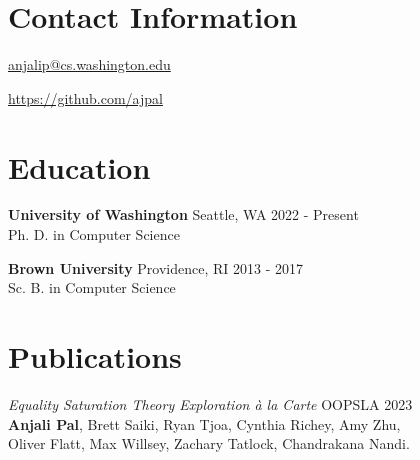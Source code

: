 \documentclass[margin, 10pt]{res} %
\begin{document}
\begin{resume}

 

\section{Contact Information}
\href{mailto:anjalip@cs.washington.edu}{anjalip@cs.washington.edu}

\href{https://github.com/ajpal}{https://github.com/ajpal}



\section{Education} 

{\textbf{University of Washington}} Seattle, WA \hfill 2022 - Present \\
Ph. D. in Computer Science

{\textbf{Brown University}} Providence, RI \hfill 2013 - 2017  \\
Sc. B. in Computer Science

\section{Publications}
{\textit{Equality Saturation Theory Exploration à la Carte}} \hfill OOPSLA 2023 \\
 \textbf{Anjali Pal}, Brett Saiki, Ryan Tjoa, Cynthia Richey, Amy Zhu, \\
 Oliver Flatt, Max Willsey, Zachary Tatlock, Chandrakana Nandi.

 
 

\end{resume}
\end{document}

